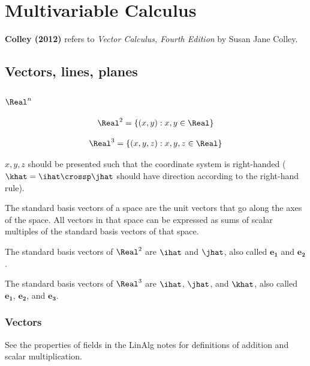\chapter{Multivariable Calculus}

\textbf{Colley (2012)} refers to \textit{Vector Calculus, Fourth Edition} by Susan Jane Colley.

\section{Vectors, lines, planes}

\subsection{$\Real^n$}

\begin{definition} 
  \[
    \Real^2 = \{ (x, y) : x, y \in \Real \}
  \]
\end{definition}

\begin{definition} 
  \[
    \Real^3 = \{ (x, y, z) : x, y, z \in \Real \}
  \]

  $x, y, z$ should be presented such that the coordinate system is right-handed ($\khat = \ihat \crossp \jhat$ should have direction according to the right-hand rule).
\end{definition}

\begin{definition} The standard basis vectors of a space are the unit vectors that go along the axes of the space. All vectors in that space can be expressed as sums of scalar multiples of the standard basis vectors of that space.

The standard basis vectors of $\Real^2$ are $\ihat$ and $\jhat$, also called $\mathbf{e_1}$ and $\mathbf{e_2}$.

The standard basis vectors of $\Real^3$ are $\ihat$, $\jhat$, and $\khat$, also called $\mathbf{e_1}$, $\mathbf{e_2}$, and $\mathbf{e_3}$.
\end{definition}

\subsection{Vectors}

See the properties of fields in the LinAlg notes for definitions of addition and scalar multiplication.

